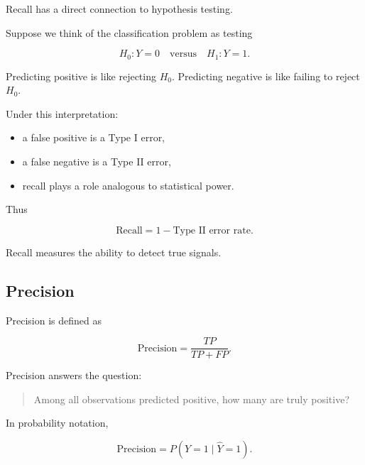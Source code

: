 \documentclass[
  letterpaper,
  DIV=11,
  numbers=noendperiod]{scrreprt}
\providecommand{\tightlist}{%
  \setlength{\itemsep}{0pt}\setlength{\parskip}{0pt}}
\theoremstyle{definition}
\theoremstyle{definition}
\theoremstyle{plain}
\theoremstyle{plain}
\theoremstyle{remark}
\begin{document}
\begin{tcolorbox}[enhanced jigsaw, arc=.35mm, bottomrule=.15mm, bottomtitle=1mm, breakable, colback=white, colbacktitle=quarto-callout-note-color!10!white, colframe=quarto-callout-note-color-frame, coltitle=black, left=2mm, leftrule=.75mm, opacityback=0, opacitybacktitle=0.6, rightrule=.15mm, title=\textcolor{quarto-callout-note-color}{\faInfo}\hspace{0.5em}{Recall and Statistical Power}, titlerule=0mm, toprule=.15mm, toptitle=1mm]

Recall has a direct connection to hypothesis testing.

Suppose we think of the classification problem as testing

\[
H_0:Y=0
\quad\text{versus}\quad
H_1:Y=1.
\]

Predicting positive is like rejecting \(H_0\). Predicting negative is
like failing to reject \(H_0\).

Under this interpretation:

\begin{itemize}
\tightlist
\item
  a false positive is a Type I error,
\item
  a false negative is a Type II error,
\item
  recall plays a role analogous to statistical power.
\end{itemize}

Thus

\[
\text{Recall}
=
1-\text{Type II error rate}.
\]

Recall measures the ability to detect true signals.

\end{tcolorbox}

\subsection{Precision}\label{precision}

Precision is defined as

\[
\text{Precision}
=
\frac{TP}{TP+FP}.
\]

Precision answers the question:

\begin{quote}
Among all observations predicted positive, how many are truly positive?
\end{quote}

In probability notation,

\[
\text{Precision}
=
P(Y=1\mid \hat Y=1).
\]
\end{document}
